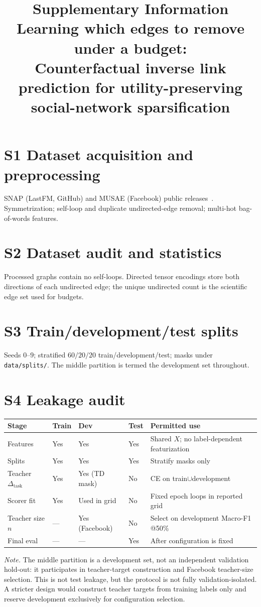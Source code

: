 \documentclass[11pt,a4paper]{article}
\title{Supplementary Information\\[0.3em]
\large Learning which edges to remove under a budget:\\
Counterfactual inverse link prediction for utility-preserving\\
social-network sparsification}
\author{}
\date{}
\begin{document}
\maketitle
\tableofcontents
\newpage

\section{S1 Dataset acquisition and preprocessing}
SNAP (LastFM, GitHub) and MUSAE (Facebook) public releases~\citep{rozemberczki2021multi}.
Symmetrization; self-loop and duplicate undirected-edge removal; multi-hot bag-of-words features.

\section{S2 Dataset audit and statistics}

Processed graphs contain no self-loops.
Directed tensor encodings store both directions of each undirected edge; the unique undirected count is the scientific edge set used for budgets.

\section{S3 Train/development/test splits}
Seeds $0$--$9$; stratified $60/20/20$ train/development/test; masks under \texttt{data/splits/}.
The middle partition is termed the development set throughout.

\section{S4 Leakage audit}
\begin{center}\small
\begin{tabular}{@{}p{2.4cm}p{2.2cm}p{2.2cm}p{2.2cm}p{3.4cm}@{}}
\toprule
Stage & Train & Dev & Test & Permitted use \\
\midrule
Features & Yes & Yes & Yes & Shared $X$; no label-dependent featurization \\
Splits & Yes & Yes & Yes & Stratify masks only \\
Teacher $\Delta_{\mathrm{task}}$ & Yes & Yes (TD mask) & No & CE on train$\cup$development \\
Scorer fit & Yes & Used in grid & No & Fixed epoch loops in reported grid \\
Teacher size $n$ & --- & Yes (Facebook) & No & Select on development Macro-F1 @50\% \\
Final eval & --- & --- & Yes & After configuration is fixed \\
\bottomrule
\end{tabular}
\end{center}
\noindent\textit{Note.}
The middle partition is a development set, not an independent validation hold-out: it participates in teacher-target construction and Facebook teacher-size selection.
This is not test leakage, but the protocol is not fully validation-isolated.
A stricter design would construct teacher targets from training labels only and reserve development exclusively for configuration selection.
\end{document}
